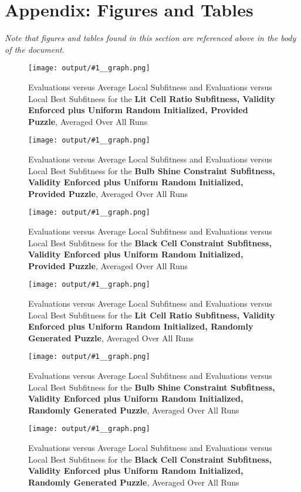 \documentclass[11pt]{article}
\newcommand{\fitnessplotcaption}[1]{\caption{Evaluations versus Average Local Subfitness and Evaluations versus 
    Local Best Subfitness for the \textbf{{#1}}, Averaged Over All Runs}}
\newcommand{\addgraphic}[1]{\centerline{\texttt{[image: output/\#1\_\_graph.png]}}}
\begin{document}
\section{Appendix: Figures and Tables}

\textit{Note that figures and tables found in this section are referenced above in the body of 
the document.}



\begin{figure}
    \addgraphic{website_puzzle/website_puzzle_lit_cell_ratio}
    \fitnessplotcaption{Lit Cell Ratio Subfitness, Validity Enforced plus Uniform Random Initialized, Provided Puzzle}
    \label{fig:website_v_ratio}
\end{figure}

\begin{figure}
    \addgraphic{website_puzzle/website_puzzle_bulb_shine_constr}
    \fitnessplotcaption{Bulb Shine Constraint Subfitness, Validity Enforced plus Uniform Random Initialized, Provided Puzzle}
    \label{fig:website_v_shine}
\end{figure}

\begin{figure}
    \addgraphic{website_puzzle/website_puzzle_black_cell_constr}
    \fitnessplotcaption{Black Cell Constraint Subfitness, Validity Enforced plus Uniform Random Initialized, Provided Puzzle}
    \label{fig:website_v_black}
\end{figure}

\begin{figure}
    \addgraphic{random_gen/random_gen_lit_cell_ratio}
    \fitnessplotcaption{Lit Cell Ratio Subfitness, Validity Enforced plus Uniform Random Initialized, Randomly Generated Puzzle}
    \label{fig:random_gen_v_ratio}
\end{figure}

\begin{figure}
    \addgraphic{random_gen/random_gen_bulb_shine_constr}
    \fitnessplotcaption{Bulb Shine Constraint Subfitness, Validity Enforced plus Uniform Random Initialized, Randomly Generated Puzzle}
    \label{fig:random_gen_v_shine}
\end{figure}

\begin{figure}
    \addgraphic{random_gen/random_gen_black_cell_constr}
    \fitnessplotcaption{Black Cell Constraint Subfitness, Validity Enforced plus Uniform Random Initialized, Randomly Generated Puzzle}
    \label{fig:random_gen_v_black}
\end{figure}
\end{document}
